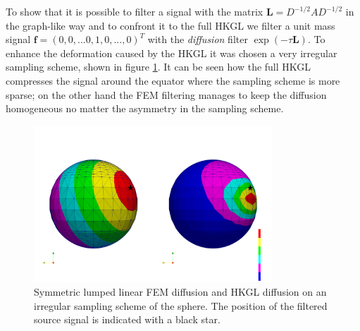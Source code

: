 To show that it is possible to filter a signal with the matrix $\mathbf L = D^{-1/2}AD^{-1/2}$ in the graph-like way and to confront it to the full HKGL we filter a unit mass signal $\mathbf{f}=(0,0,...0,1,0,...,0)^T$ with the \textit{diffusion} filter $\exp{(-\tau \mathbf L)}$. To enhance the deformation caused by the HKGL it was chosen a very irregular sampling scheme, shown in figure \ref{fig:FEM lumped symmetric diffusion on irregular sampling}. It can be seen how the full HKGL compresses the signal around the equator where the sampling scheme is more sparse; on the other hand the FEM filtering manages to keep the diffusion homogeneous no matter the asymmetry in the sampling scheme. 
\begin{figure}[h]
	\centering
	\includegraphics[width=0.8\textwidth]{figs/Chapter3/diffusion.png}
	\caption{\label{fig:FEM lumped symmetric diffusion on irregular sampling}Symmetric lumped linear FEM diffusion and HKGL diffusion on an irregular sampling scheme of the sphere. The position of the filtered source signal is indicated with a black star.}
\end{figure}






